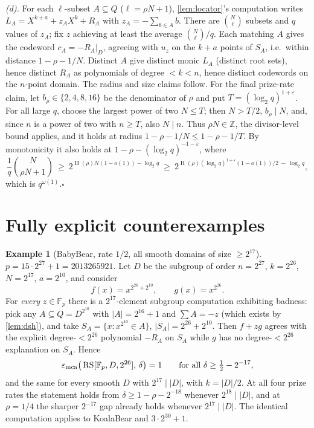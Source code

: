 \documentclass[11pt]{article}
\theoremstyle{definition}
\newtheorem{example}[example]{Example}
\newcommand{\F}{\mathbb F}
\newcommand{\Z}{\mathbb Z}
\newcommand{\RS}{\operatorname{RS}}
\newcommand{\eps}{\varepsilon}
\newcommand{\HH}{\operatorname{H}}
\begin{document}
\emph{(d).}  For each $\ell$-subset $A\subseteq Q$ ($\ell=\rho N+1$), \cref{lem:locator}'s computation writes $L_A=X^{k+a}+z_AX^k+R_A$ with $z_A=-\sum_{b\in A}b$.  There are $\binom N\ell$ subsets and $q$ values of $z_A$; fix $z$ achieving at least the average $\binom N\ell/q$.  Each matching $A$ gives the codeword $c_A=-R_A|_D$, agreeing with $u_z$ on the $k+a$ points of $S_A$, i.e.\ within distance $1-\rho-1/N$.  Distinct $A$ give distinct monic $L_A$ (distinct root sets), hence distinct $R_A$ as polynomials of degree $<k<n$, hence distinct codewords on the $n$-point domain.  The radius and size claims follow.  For the final prize-rate claim, let $b_\rho\in\{2,4,8,16\}$ be the denominator of $\rho$ and put $T=(\log_2q)^{1+\eps}$.  For all large $q$, choose the largest power of two $N\le T$; then $N>T/2$, $b_\rho\mid N$, and, since $n$ is a power of two with $n\ge T$, also $N\mid n$.  Thus $\rho N\in\Z$, the divisor-level bound applies, and it holds at radius $1-\rho-1/N\le1-\rho-1/T$.  By monotonicity it also holds at $1-\rho-(\log_2q)^{-1-\eps}$, where
\[
        \frac1q\binom{N}{\rho N+1}\ \ge\ 2^{\HH(\rho)N(1-o(1))-\log_2q}
        \ \ge\ 2^{\HH(\rho)(\log_2q)^{1+\eps}(1-o(1))/2\ -\ \log_2 q},
\]
which is $q^{\omega(1)}$.\hfill$\square$

\section{Fully explicit counterexamples}\label{sec:explicit}

\begin{example}[BabyBear, rate $1/2$, all smooth domains of size $\ge2^{17}$]\label{ex:babybear}
$p=15\cdot2^{27}+1=2013265921$.  Let $D$ be the subgroup of order $n=2^{27}$, $k=2^{26}$, $N=2^{17}$, $a=2^{10}$, and consider
\[
        f(x)=x^{2^{26}+2^{10}},\qquad g(x)=x^{2^{26}} .
\]
For \emph{every} $z\in\F_p$ there is a $2^{17}$-element subgroup computation exhibiting badness: pick any $A\subseteq Q=D^{2^{10}}$ with $|A|=2^{16}+1$ and $\sum A=-z$ (which exists by \cref{lem:dsh}), and take $S_A=\{x:x^{2^{10}}\in A\}$, $|S_A|=2^{26}+2^{10}$.  Then $f+zg$ agrees with the explicit degree-$<2^{26}$ polynomial $-R_A$ on $S_A$ while $g$ has no degree-$<2^{26}$ explanation on $S_A$.  Hence
\[
        \eps_{\rm mca}\big(\RS[\F_p,D,2^{26}],\,\delta\big)=1
        \qquad\text{for all }\delta\ge\tfrac12-2^{-17},
\]
and the same for every smooth $D$ with $2^{17}\mid|D|$, with $k=|D|/2$.  At all four prize rates the statement holds from $\delta\ge1-\rho-2^{-18}$ whenever $2^{18}\mid|D|$, and at $\rho=1/4$ the sharper $2^{-17}$ gap already holds whenever $2^{17}\mid|D|$.  The identical computation applies to KoalaBear and $3\cdot2^{30}+1$.
\end{example}
\end{document}
